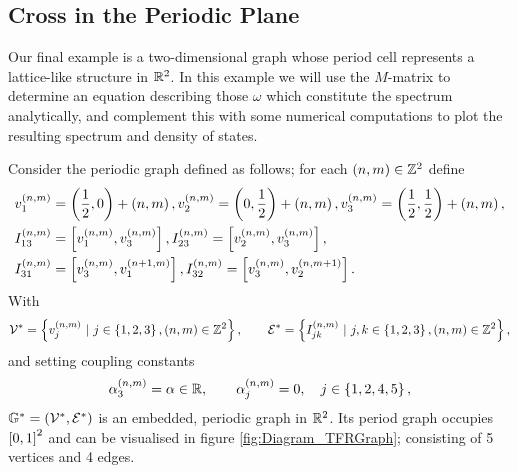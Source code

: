 \subsection{Cross in the Periodic Plane} \label{ssec:ExampleCrossInPlane}
Our final example is a two-dimensional graph whose period cell represents a lattice-like structure in $\mathbb{R}^2$.
In this example we will use the $M$-matrix to determine an equation describing those $\omega$ which constitute the spectrum analytically, and complement this with some numerical computations to plot the resulting spectrum and density of states. \newline

Consider the periodic graph defined as follows; for each $\left( n,m \right)\in\mathbb{Z}^2$ define
\begin{align*}
	& v_1^{\left( n,m \right)} = \left( \frac{1}{2},0 \right) + \left( n,m \right), 
	v_2^{\left( n,m \right)} = \left( 0,\frac{1}{2} \right) + \left( n,m \right),
	v_3^{\left( n,m \right)} = \left( \frac{1}{2},\frac{1}{2} \right) + \left( n,m \right), \\
	& I_{13}^{\left( n,m \right)} = \left[ v_1^{\left( n,m \right)}, v_3^{\left( n,m \right)} \right],
	I_{23}^{\left( n,m \right)} = \left[ v_2^{\left( n,m \right)}, v_3^{\left( n,m \right)} \right], \\
	& I_{31}^{\left( n,m \right)} = \left[ v_3^{\left( n,m \right)}, v_1^{\left( n+1,m \right)} \right],
	I_{32}^{\left( n,m \right)} = \left[ v_3^{\left( n,m \right)}, v_2^{\left( n,m+1 \right)} \right].
\end{align*}
With 
\begin{align*}
	\vertSet^* = \clbracs{v_j^{\bracs{n,m}} \ \vert \ j\in\clbracs{1,2,3}, \bracs{n,m}\in\integers^2},
	\qquad \edgeSet^* = \clbracs{I_{jk}^{\bracs{n,m}} \ \vert \ j,k\in\clbracs{1,2,3}, \bracs{n,m}\in\integers^2},
\end{align*}
and setting coupling constants
\begin{align*}
	\alpha_3^{\left( n,m \right)} = \alpha \in\mathbb{R}, 
	\qquad \alpha_j^{\left( n,m \right)} = 0, \quad j\in\left\{ 1,2,4,5 \right\},
\end{align*}
$\mathbb{G}^* = \left( \mathcal{V}^*,\mathcal{E}^* \right)$ is an embedded, periodic graph in $\mathbb{R}^2$.
Its period graph occupies $\left[ 0,1 \right]^2$ and can be visualised in figure \ref{fig:Diagram_TFRGraph}; consisting of 5 vertices and 4 edges.
